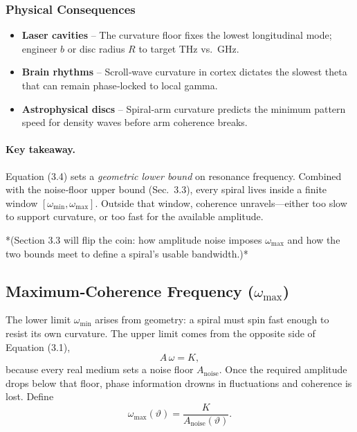\medskip
\subsubsection{Physical Consequences}

\begin{itemize}
  \item \textbf{Laser cavities} – The curvature floor fixes the lowest longitudinal mode; engineer \(b\) or disc radius \(R\) to target THz vs.\ GHz.
  \item \textbf{Brain rhythms} – Scroll‐wave curvature in cortex dictates the slowest theta that can remain phase‐locked to local gamma.
  \item \textbf{Astrophysical discs} – Spiral‐arm curvature predicts the minimum pattern speed for density waves before arm coherence breaks.
\end{itemize}

\medskip
\paragraph{Key takeaway.}  
Equation (3.4) sets a \emph{geometric lower bound} on resonance frequency.  Combined with the noise‐floor upper bound (Sec.\ 3.3), every spiral lives inside a finite window \([\omega_{\min},\omega_{\max}]\).  Outside that window, coherence unravels—either too slow to support curvature, or too fast for the available amplitude.

*(Section 3.3 will flip the coin: how amplitude noise imposes \(\omega_{\max}\) and how the two bounds meet to define a spiral’s usable bandwidth.)*  

\subsection{Maximum‐Coherence Frequency (\(\omega_{\max}\))}

\medskip

The lower limit \(\omega_{\min}\) arises from geometry: a spiral must spin fast enough to resist its own curvature.  The upper limit comes from the opposite side of Equation (3.1),
\[
  A\,\omega = K,
  \tag{3.1}
\]
because every real medium sets a noise floor \(A_{\mathrm{noise}}\).  Once the required amplitude drops below that floor, phase information drowns in fluctuations and coherence is lost.  Define
\[
  \omega_{\max}(\vartheta)
  = \frac{K}{A_{\mathrm{noise}}(\vartheta)}.
  \tag{3.5}
\]

